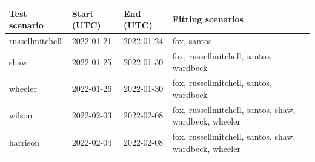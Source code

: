 \begin{tabular}{lll p{}}
\toprule
Test scenario & Start (UTC) & End (UTC) & Fitting scenarios \\
\midrule
russellmitchell & 2022-01-21 & 2022-01-24 & fox, santos \\
shaw & 2022-01-25 & 2022-01-30 & fox, russellmitchell, santos, wardbeck \\
wheeler & 2022-01-26 & 2022-01-30 & fox, russellmitchell, santos, wardbeck \\
wilson & 2022-02-03 & 2022-02-08 & fox, russellmitchell, santos, shaw, wardbeck, wheeler \\
harrison & 2022-02-04 & 2022-02-08 & fox, russellmitchell, santos, shaw, wardbeck, wheeler \\
\bottomrule
\end{tabular}
